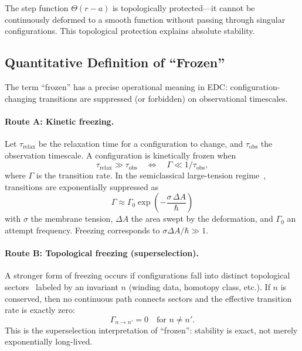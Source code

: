 The step function $\Theta(r-a)$ is topologically protected---it cannot be continuously
deformed to a smooth function without passing through singular configurations. This
topological protection explains absolute stability.

\subsection{Quantitative Definition of ``Frozen''}

The term ``frozen'' has a precise operational meaning in EDC: configuration-changing
transitions are suppressed (or forbidden) on observational timescales.

\paragraph{Route A: Kinetic freezing.}
Let $\tau_{\mathrm{relax}}$ be the relaxation time for a configuration to change, and
$\tau_{\mathrm{obs}}$ the observation timescale. A configuration is kinetically frozen when
\begin{equation}
\tau_{\mathrm{relax}} \gg \tau_{\mathrm{obs}} \quad \Longleftrightarrow \quad
\Gamma \ll 1/\tau_{\mathrm{obs}},
\label{eq:ch2_kinetic_freezing}
\end{equation}
where $\Gamma$ is the transition rate. In the semiclassical large-tension
regime~\cite{LandauLifshitz1977,Coleman1977}, transitions are exponentially suppressed as
\begin{equation}
\boxed{\Gamma \approx \Gamma_0 \exp\!\left(-\frac{\sigma\,\Delta A}{\hbar}\right)}
\label{eq:ch2_gamma_suppression}
\end{equation}
with $\sigma$ the membrane tension, $\Delta A$ the area swept by the deformation, and
$\Gamma_0$ an attempt frequency. Freezing corresponds to $\sigma\Delta A/\hbar \gg 1$.

\paragraph{Route B: Topological freezing (superselection).}
A stronger form of freezing occurs if configurations fall into distinct topological
sectors~\cite{Nakahara2003} labeled by an invariant $n$ (winding data, homotopy class, etc.). If $n$ is
conserved, then no continuous path connects sectors and the effective transition rate
is exactly zero:
\begin{equation}
\Gamma_{n\to n'} = 0 \quad \text{for } n\neq n'.
\label{eq:ch2_superselection}
\end{equation}
This is the superselection interpretation of ``frozen'': stability is exact, not merely
exponentially long-lived.


